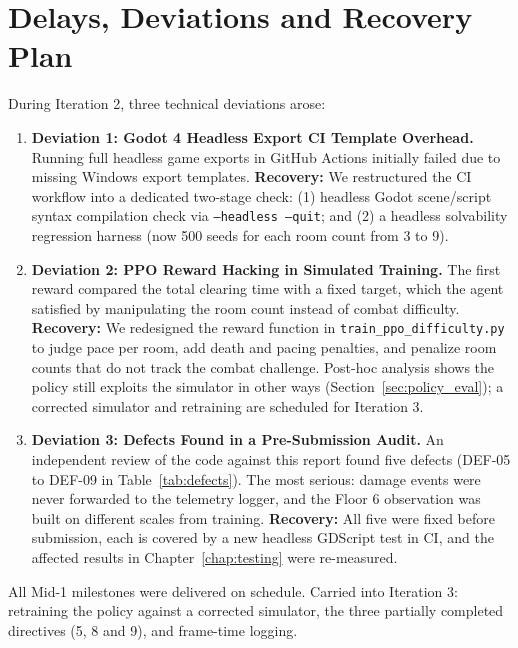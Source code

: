 \section{Delays, Deviations and Recovery Plan}
During Iteration 2, three technical deviations arose:
\begin{enumerate}
    \item \textbf{Deviation 1: Godot 4 Headless Export CI Template Overhead.} Running full headless game exports in GitHub Actions initially failed due to missing Windows export templates. \textbf{Recovery:} We restructured the CI workflow into a dedicated two-stage check: (1) headless Godot scene/script syntax compilation check via \texttt{--headless --quit}; and (2) a headless solvability regression harness (now 500 seeds for each room count from 3 to 9).
    \item \textbf{Deviation 2: PPO Reward Hacking in Simulated Training.} The first reward compared the total clearing time with a fixed target, which the agent satisfied by manipulating the room count instead of combat difficulty. \textbf{Recovery:} We redesigned the reward function in \texttt{train\_ppo\_difficulty.py} to judge pace per room, add death and pacing penalties, and penalize room counts that do not track the combat challenge. Post-hoc analysis shows the policy still exploits the simulator in other ways (Section~\ref{sec:policy_eval}); a corrected simulator and retraining are scheduled for Iteration 3.
    \item \textbf{Deviation 3: Defects Found in a Pre-Submission Audit.} An independent review of the code against this report found five defects (DEF-05 to DEF-09 in Table~\ref{tab:defects}). The most serious: damage events were never forwarded to the telemetry logger, and the Floor 6 observation was built on different scales from training. \textbf{Recovery:} All five were fixed before submission, each is covered by a new headless GDScript test in CI, and the affected results in Chapter~\ref{chap:testing} were re-measured.
\end{enumerate}
All Mid-1 milestones were delivered on schedule. Carried into Iteration 3: retraining the policy against a corrected simulator, the three partially completed directives (5, 8 and 9), and frame-time logging.
